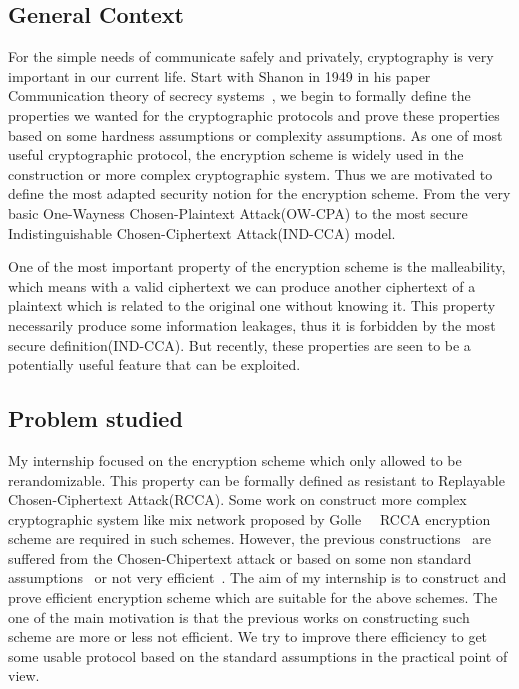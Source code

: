 \subsection*{General Context}

For the simple needs of communicate safely and privately, cryptography is very important in our current life. 
Start with Shanon in 1949 in his paper Communication theory of secrecy systems~\cite{shannon-otp},
we begin to formally define the properties we wanted for the cryptographic protocols and prove these properties based on some hardness assumptions or complexity assumptions.
As one of most useful cryptographic protocol, the encryption scheme is widely used in the construction or more complex cryptographic system.
Thus we are motivated to define the most adapted security notion for the encryption scheme. 
From the very basic One-Wayness Chosen-Plaintext Attack(OW-CPA) to the most secure Indistinguishable Chosen-Ciphertext Attack(IND-CCA) model. 

One of the most important property of the encryption scheme is the malleability, 
which means with a valid ciphertext we can produce another ciphertext of a plaintext which is related to the original one without knowing it.
This property necessarily produce some information leakages,
thus it is forbidden by the most secure definition(IND-CCA).
But recently, these properties are seen to be a potentially useful feature that can be exploited.

\subsection*{Problem studied}
My internship focused on the encryption scheme which only allowed to be rerandomizable.
This property can be formally defined as resistant to Replayable Chosen-Ciphertext Attack(RCCA).
Some work on construct more complex cryptographic system like mix network proposed by Golle~\etal~\cite{DBLP:conf/ctrsa/GolleJJS04}
RCCA encryption scheme are required in such schemes.
However, the previous constructions~\cite{DBLP:conf/ctrsa/GolleJJS04} are suffered from the Chosen-Chipertext attack or based on some non standard assumptions~\cite{DBLP:conf/crypto/PrabhakaranR07} or not very efficient~\cite{DBLP:conf/eurocrypt/ChaseKLM12}.
The aim of my internship is to construct and prove efficient encryption scheme which are suitable for the above schemes.
The one of the main motivation is that the previous works on constructing such scheme are more or less not efficient.
We try to improve there efficiency to get some usable protocol based on the standard assumptions in the practical point of view.

